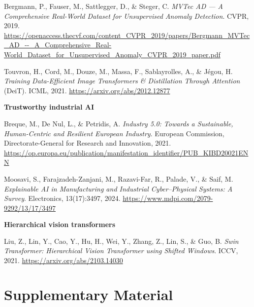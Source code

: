 \documentclass[11pt,a4paper]{article}
\begin{document}
\begin{list}{}{\setlength{\leftmargin}{2.5em}\setlength{\labelwidth}{2em}\setlength{\labelsep}{0.3em}\setlength{\itemsep}{0.2ex}}
\item[19.] Bergmann, P., Fauser, M., Sattlegger, D., \& Steger, C. \emph{MVTec AD --- A Comprehensive Real-World Dataset for Unsupervised Anomaly Detection}. CVPR, 2019. \url{https://openaccess.thecvf.com/content_CVPR_2019/papers/Bergmann_MVTec_AD_--_A_Comprehensive_Real-World_Dataset_for_Unsupervised_Anomaly_CVPR_2019_paper.pdf}
\item[20.] Touvron, H., Cord, M., Douze, M., Massa, F., Sablayrolles, A., \& J\'egou, H. \emph{Training Data-Efficient Image Transformers \& Distillation Through Attention} (DeiT). ICML, 2021. \url{https://arxiv.org/abs/2012.12877}
\end{list}

\textbf{Trustworthy industrial AI}

\begin{list}{}{\setlength{\leftmargin}{2.5em}\setlength{\labelwidth}{2em}\setlength{\labelsep}{0.3em}\setlength{\itemsep}{0.2ex}}
\item[21.] Breque, M., De Nul, L., \& Petridis, A. \emph{Industry 5.0: Towards a Sustainable, Human-Centric and Resilient European Industry}. European Commission, Directorate-General for Research and Innovation, 2021. \url{https://op.europa.eu/publication/manifestation_identifier/PUB_KIBD20021ENN}
\item[22.] Moosavi, S., Farajzadeh-Zanjani, M., Razavi-Far, R., Palade, V., \& Saif, M. \emph{Explainable AI in Manufacturing and Industrial Cyber--Physical Systems: A Survey}. Electronics, 13(17):3497, 2024. \url{https://www.mdpi.com/2079-9292/13/17/3497}
\end{list}

\textbf{Hierarchical vision transformers}

\begin{list}{}{\setlength{\leftmargin}{2.5em}\setlength{\labelwidth}{2em}\setlength{\labelsep}{0.3em}\setlength{\itemsep}{0.2ex}}
\item[23.] Liu, Z., Lin, Y., Cao, Y., Hu, H., Wei, Y., Zhang, Z., Lin, S., \& Guo, B. \emph{Swin Transformer: Hierarchical Vision Transformer using Shifted Windows}. ICCV, 2021. \url{https://arxiv.org/abs/2103.14030}
\end{list}


\clearpage
\appendix
{}
\section*{Supplementary Material}
\end{document}
